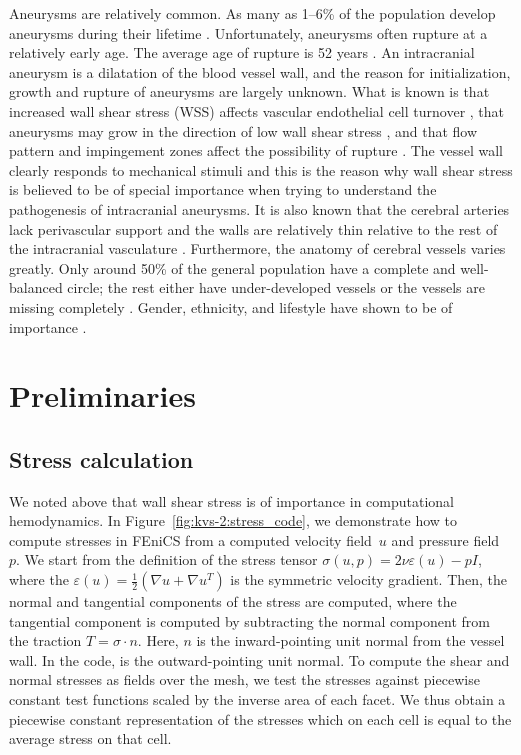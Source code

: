 Aneurysms are relatively common. As many as 1--6\% of the population
develop aneurysms during their
lifetime \citep{Weir2002}. Unfortunately, aneurysms often rupture at a
relatively early age. The average age of rupture is 52
years \citep{Humphrey2001}. An intracranial aneurysm is a dilatation of
the blood vessel wall, and the reason for initialization, growth and
rupture of aneurysms are largely unknown.  What is known is that
increased wall shear stress (WSS) affects vascular endothelial cell
turnover \citep{DAVIESREMUZZIGORDONEtAl1986}, that aneurysms may grow
in the direction of low wall shear
stress \citep{BousselRayzMcCullochEtAl2008}, and that flow pattern and
impingement zones affect the possibility of
rupture \citep{CebralCastroBurgessEtAl2005}. The vessel wall clearly
responds to mechanical stimuli and this is the reason why wall shear
stress is believed to be of special importance when trying to understand the
pathogenesis of intracranial aneurysms. It is also known that the
cerebral arteries lack perivascular support and the walls are
relatively thin relative to the rest of the intracranial
vasculature \citep{Humphrey2001,Stehbens1975}.  Furthermore, the
anatomy of cerebral vessels varies greatly. Only around 50\% of the
general population have a complete and well-balanced circle; the rest either have
under-developed vessels or the vessels are missing
completely \citep{Fung1984}. Gender, ethnicity, and lifestyle have
shown to be of
importance \citep{MhurchuAndersonJamrozikEtAl2001,LongstrethNelsonKoepsellEtAl1994,KongableLanzinoGermansonEtAl1996}.

\section{Preliminaries}

\subsection{Stress calculation}

We noted above that wall shear stress is of importance in
computational hemodynamics. In Figure~\ref{fig:kvs-2:stress_code}, we
demonstrate how to compute stresses in FEniCS from a computed velocity
field~$u$ and pressure field~$p$. We start from the definition of the
stress tensor $\sigma(u,p) = 2 \nu \varepsilon (u) - p I$, where the
$\varepsilon(u) = \frac{1}{2}(\nabla u + \nabla u^T)$ is the symmetric
velocity gradient. Then, the normal and tangential components of the
stress are computed, where the tangential component is computed by
subtracting the normal component from the traction $T = \sigma \cdot
n$. Here, $n$ is the inward-pointing unit normal from the vessel
wall. In the code,  is the outward-pointing unit normal. To
compute the shear and normal stresses as fields over the mesh, we test
the stresses against piecewise constant test functions scaled by the
inverse area of each facet. We thus obtain a piecewise constant
representation of the stresses which on each cell is equal to the
average stress on that cell.

